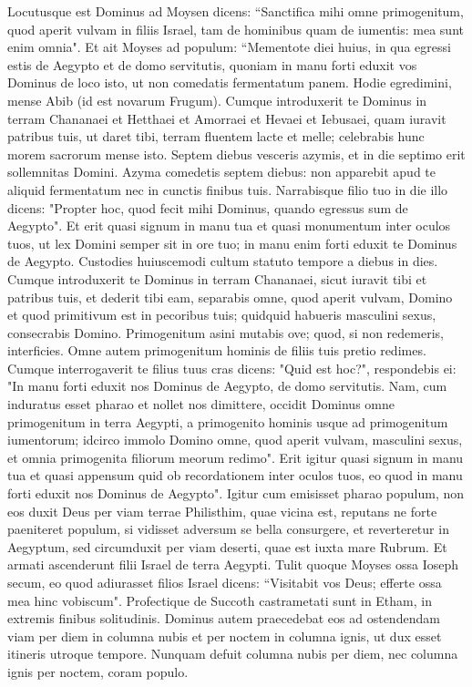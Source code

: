 \begin{biblechapter}  
\verse Locutusque est Dominus ad Moysen dicens: 
\verse “Sanctifica mihi omne primogenitum, quod aperit vulvam in filiis Israel, tam de hominibus quam de iumentis: mea sunt enim omnia". 
\verse Et ait Moyses ad populum: “Mementote diei huius, in qua egressi estis de Aegypto et de domo servitutis, quoniam in manu forti eduxit vos Dominus de loco isto, ut non comedatis fermentatum panem. 
\verse Hodie egredimini, mense Abib (id est novarum Frugum). 
\verse Cumque introduxerit te Dominus in terram Chananaei et Hetthaei et Amorraei et Hevaei et Iebusaei, quam iuravit patribus tuis, ut daret tibi, terram fluentem lacte et melle; celebrabis hunc morem sacrorum mense isto. 
\verse Septem diebus vesceris azymis, et in die septimo erit sollemnitas Domini.  
\verse Azyma comedetis septem diebus: non apparebit apud te aliquid fermentatum nec in cunctis finibus tuis. 
\verse Narrabisque filio tuo in die illo dicens: "Propter hoc, quod fecit mihi Dominus, quando egressus sum de Aegypto". 
\verse Et erit quasi signum in manu tua et quasi monumentum inter oculos tuos, ut lex Domini semper sit in ore tuo; in manu enim forti eduxit te Dominus de Aegypto.  
\verse Custodies huiuscemodi cultum statuto tempore a diebus in dies. 
\verse Cumque introduxerit te Dominus in terram Chananaei, sicut iuravit tibi et patribus tuis, et dederit tibi eam, 
\verse separabis omne, quod aperit vulvam, Domino et quod primitivum est in pecoribus tuis; quidquid habueris masculini sexus, consecrabis Domino. 
\verse Primogenitum asini mutabis ove; quod, si non redemeris, interficies. Omne autem primogenitum hominis de filiis tuis pretio redimes. 
\verse Cumque interrogaverit te filius tuus cras dicens: "Quid est hoc?", respondebis ei: "In manu forti eduxit nos Dominus de Aegypto, de domo servitutis. 
\verse Nam, cum induratus esset pharao et nollet nos dimittere, occidit Dominus omne primogenitum in terra Aegypti, a primogenito hominis usque ad primogenitum iumentorum; idcirco immolo Domino omne, quod aperit vulvam, masculini sexus, et omnia primogenita filiorum meorum redimo". 
\verse Erit igitur quasi signum in manu tua et quasi appensum quid ob recordationem inter oculos tuos, eo quod in manu forti eduxit nos Dominus de Aegypto". 
\verse Igitur cum emisisset pharao populum, non eos duxit Deus per viam terrae Philisthim, quae vicina est, reputans ne forte paeniteret populum, si vidisset adversum se bella consurgere, et reverteretur in Aegyptum, 
\verse sed circumduxit per viam deserti, quae est iuxta mare Rubrum. Et armati ascenderunt filii Israel de terra Aegypti. 
\verse Tulit quoque Moyses ossa Ioseph secum, eo quod adiurasset filios Israel dicens: “Visitabit vos Deus; efferte ossa mea hinc vobiscum". 
\verse Profectique de Succoth castrametati sunt in Etham, in extremis finibus solitudinis. 
\verse Dominus autem praecedebat eos ad ostendendam viam per diem in columna nubis et per noctem in columna ignis, ut dux esset itineris utroque tempore. 
\verse Nunquam defuit columna nubis per diem, nec columna ignis per noctem, coram populo. 
\end{biblechapter}

